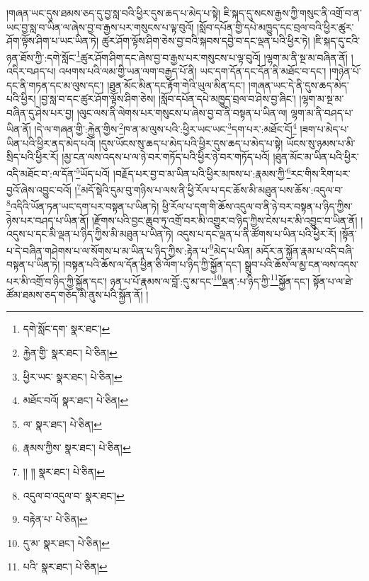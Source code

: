 །གཞན་ཡང་དུས་ཐམས་ཅད་དུ་བྱ་སླ་བའི་ཕྱིར་དུས་ཆད་པ་མེད་པ་སྟེ། ཇི་སྐད་དུ་སངས་རྒྱས་ཀྱི་གསུང་ནི་འགྲོ་བ་ན་ཡང་བྱ་སླ་བ་ཡིན་ལ་ཞེས་བྱ་བ་རྒྱས་པར་གསུངས་པ་ལྟ་བུའོ། །སློབ་དཔོན་གྱི་དཔེ་མཁྱུད་དང་བྲལ་བའི་ཕྱིར་ཚུར་ཤོག་ལྟོས་ཤིག་པ་ཡང་ཡིན་ཏེ། ཚུར་ཤོག་ལྟོས་ཤིག་ཅེས་བྱ་བའི་སྐབས་དབྱེ་བ་དང་ལྡན་པའི་ཕྱིར་ཏེ། །ཇི་སྐད་དུ་ངའི་ཉན་ཐོས་ཀྱི་:དགེ་སློང་\footnote{དགེ་སློང་དག་  སྣར་ཐང་། }ཚུར་ཤོག་ཤིག་དང་ཞེས་བྱ་བ་རྒྱས་པར་གསུངས་པ་ལྟ་བུའོ། །ལྷག་མ་ནི་སྔ་མ་བཞིན་ནོ། །འདིར་བཤད་པ། འཕགས་པའི་ལམ་གྱི་ཡན་ལག་བརྒྱད་པོ་ནི། ཡང་དག་དོན་དང་དོན་ནི་མཐོང་བ་དང་། །གཉེན་པོ་དང་ནི་གཏན་དང་མ་ལུས་དང་། །ཐུན་མོང་མིན་དང་རྟོག་གེའི་ཡུལ་མིན་དང་། །གཞན་ཡང་དེ་ནི་དུས་ཆད་མེད་པའི་ཕྱིར། །བྱ་སླ་བ་དང་ཚུར་ཤོག་ལྟོས་ཤིག་ཅེས། །སློབ་དཔོན་དཔེ་མཁྱུད་བྲལ་བ་ཤེས་བྱ་ཞིང་། །ལྷག་མ་སྔ་མ་བཞིན་དུ་ཤེས་པར་བྱ། །ལུང་ལས་ནི་ལེགས་པར་གསུངས་པ་ཞེས་བྱ་བ་ནི་བསྟན་པ་ཡིན་ལ། ལྷག་མ་ནི་བཤད་པ་ཡིན་ནོ། །དེ་ལ་གཞན་གྱི་:རྐྱེན་གྱིས་\footnote{རྐྱེན་གྱི་  སྣར་ཐང་།  པེ་ཅིན། }ཁ་ན་མ་ལུས་པའི་:ཕྱིར་ཡང་ཡང་\footnote{ཕྱིར་ཡང་  སྣར་ཐང་།  པེ་ཅིན། }དག་པར་:མཐོང་ངོ།\footnote{མཐོང་བའོ།  སྣར་ཐང་།  པེ་ཅིན། } །ཟག་པ་མེད་པ་ཡིན་པའི་ཕྱིར་ནད་མེད་པའོ། །དུས་ཡོངས་སུ་ཆད་པ་མེད་པའི་ཕྱིར་དུས་ཆད་པ་མེད་པ་སྟེ། ཡོངས་སུ་ཉམས་པ་མི་སྲིད་པའི་ཕྱིར་རོ། །མྱ་ངན་ལས་འདས་པ་ལ་ཉེ་བར་གཏོད་པའི་ཕྱིར་ཉེ་བར་གཏོད་པའོ། །ཐུན་མོང་མ་ཡིན་པའི་ཕྱིར་འདི་མཐོང་བ་:ལ་དོན་\footnote{ལ་  སྣར་ཐང་།  པེ་ཅིན། }ཡོད་པའོ། །བརྗོད་པར་བྱ་བ་མ་ཡིན་པའི་ཕྱིར་མཁས་པ་:རྣམས་ཀྱི་\footnote{རྣམས་ཀྱིས་  སྣར་ཐང་།  པེ་ཅིན། }རང་གིས་རིག་པར་བྱའོ་ཞེས་འབྱུང་བའོ། །\footnote{།། །།  སྣར་ཐང་།  པེ་ཅིན། }མདོ་སྡེའི་དུམ་བུ་གཉིས་པ་ལས་ནི་ཕྱི་རོལ་པ་དང་ཆོས་མི་མཐུན་པས་ཆོས་:འདུལ་བ་\footnote{འདུལ་བ་འདུལ་བ་  སྣར་ཐང་། }འདིའི་ཡོན་ཏན་ཡང་དག་པར་བསྟན་པ་ཡིན་ཏེ། ཕྱི་རོལ་པ་དག་གི་ཆོས་འདུལ་བ་ནི་ཉེ་བར་བསྟན་པ་ཉིད་ཀྱིས་ཉེས་པར་བཤད་པ་ཡིན་ནོ། །རྫོགས་པའི་བྱང་ཆུབ་ཏུ་འགྲོ་བར་མི་འགྱུར་བ་ཉིད་ཀྱིས་ངེས་པར་མི་འབྱུང་བ་ཡིན་ནོ། །འདུས་པ་དང་མི་ལྡན་པ་ཉིད་ཀྱིས་མི་མཐུན་པ་ཡིན་ཏེ། འདུས་པ་དང་ལྡན་པ་ནི་ཚོགས་པ་ཡིན་པའི་ཕྱིར་རོ། །སྟོན་པ་དེ་བཞིན་གཤེགས་པ་ལ་སོགས་པ་མ་ཡིན་པ་ཉིད་ཀྱིས་:རྟེན་པ་\footnote{བརྟེན་པ་  པེ་ཅིན། }མེད་པ་ཡིན། མདོར་ན་སྐྱོན་རྣམ་པ་འདི་བཞི་བསྟན་པ་ཡིན་ཏེ། །བསྟན་པའི་ཆོས་ལ་དོན་ཕྱིན་ཅི་ལོག་པ་ཉིད་ཀྱི་སྐྱོན་དང་། སྒྲུབ་པའི་ཆོས་ལ་མྱ་ངན་ལས་འདས་པར་མི་འགྲོ་བ་ཉིད་ཀྱི་སྐྱོན་དང་། ཉན་པ་པོ་རྣམས་ལ་བློ་:དུ་མ་དང་\footnote{དུ་མ་  སྣར་ཐང་།  པེ་ཅིན། }ལྡན་:པ་ཉིད་ཀྱི་\footnote{པའི་  སྣར་ཐང་།  པེ་ཅིན། }སྐྱོན་དང་། སྟོན་པ་ལ་ཐེ་ཚོམ་ཐམས་ཅད་གཅོད་མི་ནུས་པའི་སྐྱོན་ནོ། །
